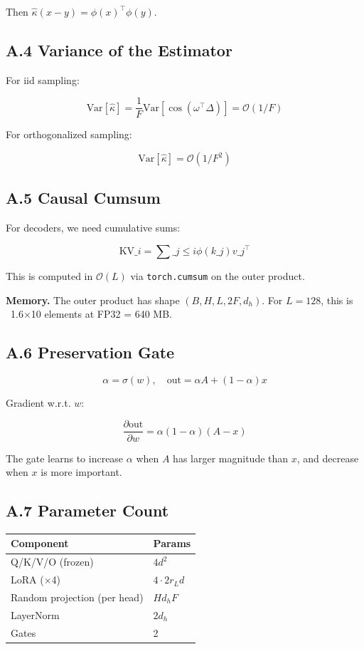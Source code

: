 Then $\hat{\kappa}(x - y) = \phi(x)^\top \phi(y)$.

\subsection{A.4 Variance of the Estimator}

For iid sampling:

\[
\text{Var}[\hat{\kappa}] = \frac{1}{F} \text{Var}[\cos(\omega^\top \Delta)] = \mathcal{O}(1/F)
\tag{A.8}
\]

For orthogonalized sampling:

\[
\text{Var}[\hat{\kappa}] = \mathcal{O}(1/F^2)
\tag{A.9}
\]

\subsection{A.5 Causal Cumsum}

For decoders, we need cumulative sums:

\[
\text{KV}\_i = \sum\_{j \leq i} \phi(k\_j) v\_j^\top
\tag{A.10}
\]

This is computed in $\mathcal{O}(L)$ via \texttt{torch.cumsum} on the outer product.

\textbf{Memory.} The outer product has shape $(B, H, L, 2F, d_h)$. For 
$L = 128$, this is ~1.6$\times$10  elements at FP32 = 640 MB.

\subsection{A.6 Preservation Gate}

\[
\alpha = \sigma(w), \quad \text{out} = \alpha A + (1 - \alpha) x
\tag{A.11}
\]

Gradient w.r.t. $w$:

\[
\frac{\partial \text{out}}{\partial w} = \alpha(1 - \alpha)(A - x)
\tag{A.12}
\]

The gate learns to increase $\alpha$ when $A$ has larger magnitude than $x$, and 
decrease when $x$ is more important.

\subsection{A.7 Parameter Count}

\begin{table}[H]
\centering
\small
\begin{tabular}{ll}
\toprule
\textbf{Component} & \textbf{Params} \\
\midrule
Q/K/V/O (frozen) & $4 d^2$ \\
LoRA ($\times$4) & $4 \cdot 2 r_L d$ \\
Random projection (per head) & $H d_h F$ \\
LayerNorm & $2 d_h$ \\
Gates & 2 \\
\bottomrule
\end{tabular}
\end{table}


